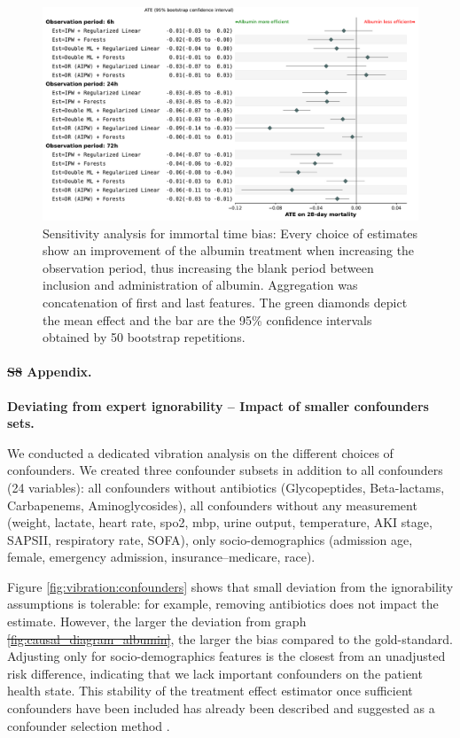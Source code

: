 \documentclass[10pt,letterpaper]{article}
\providecommand{\DIFaddtex}[1]{{\protect\color{blue}\uwave{#1}}} %
\providecommand{\DIFdeltex}[1]{{\protect\color{red}\sout{#1}}}                      %
\providecommand{\DIFaddbegin}{} %
\providecommand{\DIFaddend}{} %
\providecommand{\DIFdelbegin}{} %
\providecommand{\DIFdelend}{} %
\providecommand{\DIFadd}[1]{\texorpdfstring{\DIFaddtex{#1}}{#1}} %
\providecommand{\DIFdel}[1]{\texorpdfstring{\DIFdeltex{#1}}{}} %
\newcommand{\DIFscaledelfig}{0.5}
\newlength{\DIFdelgraphicswidth} %
\newlength{\DIFdelgraphicsheight} %
\newcommand{\DIFaddincludegraphics}[2][]{{\color{blue}\fbox{\DIFOincludegraphics[#1]{#2}}}} %
\newcommand{\DIFdelincludegraphics}[2][]{%
\sbox{\DIFdelgraphicsbox}{\DIFOincludegraphics[#1]{#2}}%
\settoboxwidth{\DIFdelgraphicswidth}{\DIFdelgraphicsbox} %
\settoboxtotalheight{\DIFdelgraphicsheight}{\DIFdelgraphicsbox} %
\scalebox{\DIFscaledelfig}{%
\parbox[b]{\DIFdelgraphicswidth}{\usebox{\DIFdelgraphicsbox}\\[-\baselineskip] \rule{\DIFdelgraphicswidth}{0em}}\llap{\resizebox{\DIFdelgraphicswidth}{\DIFdelgraphicsheight}{%
\setlength{\unitlength}{\DIFdelgraphicswidth}%
\begin{picture}(1,1)%
\thicklines\linethickness{2pt} %
{\color[rgb]{1,0,0}\put(0,0){\framebox(1,1){}}}%
{\color[rgb]{1,0,0}\put(0,0){\line( 1,1){1}}}%
{\color[rgb]{1,0,0}\put(0,1){\line(1,-1){1}}}%
\end{picture}%
}\hspace*{3pt}}} %
} %
\DeclareRobustCommand{\DIFaddbegin}{\DIFOaddbegin \let\includegraphics\DIFaddincludegraphics} %
\DeclareRobustCommand{\DIFaddend}{\DIFOaddend \let\includegraphics\DIFOincludegraphics} %
\DeclareRobustCommand{\DIFdelbegin}{\DIFOdelbegin \let\includegraphics\DIFdelincludegraphics} %
\DeclareRobustCommand{\DIFdelend}{\DIFOaddend \let\includegraphics\DIFOincludegraphics} %
\begin{document}
\begin{figure}[h!]
  \centering
  \includegraphics[width=\linewidth]{img_supp/itb__dr_forest_agg_first_last__bs_30_supp.pdf}
  \caption{Sensitivity analysis for immortal time bias: Every choice of
    estimates show an improvement of the albumin treatment when increasing the
    observation period, thus increasing the blank period between inclusion and
    administration of albumin. Aggregation was concatenation of first and last
    features. The green diamonds depict the mean effect and the bar are the
    95\% confidence intervals obtained by 50 bootstrap
    repetitions.}\label{apd:fig:detailed_results_itb}
\end{figure}
\clearpage

\paragraph*{\DIFdelbegin \DIFdel{S8 }\DIFdelend \DIFaddbegin \DIFadd{S6 }\DIFaddend Appendix.}
\label{apd:vibration_analysis_for_confounders}
{\bf Deviating from expert ignorability -- Impact of smaller confounders sets.}


We conducted a dedicated vibration analysis on the different choices of
confounders. We created three confounder subsets in addition to all
confounders (24 variables): all confounders without antibiotics
(Glycopeptides, Beta-lactams, Carbapenems, Aminoglycosides), all confounders
without any measurement (weight, lactate, heart rate,
spo2, mbp, urine output, temperature, AKI stage, SAPSII, respiratory rate, SOFA), only
socio-demographics (admission age, female, emergency admission,
insurance--medicare, race).

Figure \ref{fig:vibration:confounders} shows that small
deviation from the ignorability assumptions is tolerable: for example, removing
antibiotics does not impact the estimate. However, the larger the
deviation from graph \DIFdelbegin \DIFdel{\ref{fig:causal_diagram_albumin}}\DIFdelend \DIFaddbegin {}\DIFaddend , the larger the bias
compared to the gold-standard. Adjusting only for socio-demographics features
is the closest from an unadjusted risk difference, indicating that we lack
important confounders on the patient health state. This stability of the
treatment effect estimator once sufficient confounders have been included has
already been described and suggested as a confounder selection method
\cite{loh2021confounder}.
\clearpage
\end{document}
